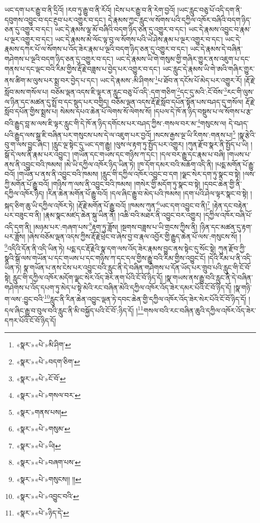 ཡང་དག་པར་རྒྱུ་བ་ནི་དྲིའོ། །རབ་ཏུ་རྒྱུ་བ་ནི་རོའོ། །ངེས་པར་རྒྱུ་བ་ནི་རེག་བྱའོ། །ཡང་རླུང་བཅུ་པོ་འདི་དག་ནི་དབུགས་འབྱུང་བ་དང་རྔུབ་པར་འགྱུར་བ་དང་། དེ་རྣམས་ཀྱང་རླུང་ལ་སོགས་པའི་དཀྱིལ་འཁོར་བཞིའི་བདག་ཉིད་ཅན་དུ་འགྱུར་བ་དང་། ཡང་དེ་རྣམས་ལྷ་མོ་བཞིའི་བདག་ཉིད་ཅན་དུ་འགྱུར་བ་དང་། ཡང་དེ་རྣམས་འབྱུང་བ་རྣམ་པ་ལྔར་འགྱུར་བ་དང་། ཡང་དེ་རྣམས་མེ་ལོང་ལྟ་བུ་ལ་སོགས་པའི་ཡེ་ཤེས་རྣམ་པ་ལྔར་འགྱུར་བ་དང་། ཡང་དེ་རྣམས་དཀར་པོ་ལ་སོགས་པ་འོད་ཟེར་རྣམ་པ་ལྔའི་བདག་ཉིད་ཅན་དུ་འགྱུར་བ་དང་། ཡང་དེ་རྣམས་དེ་བཞིན་གཤེགས་པ་ལྔའི་བདག་ཉིད་ཅན་དུ་འགྱུར་བ་དང་། ཡང་དེ་རྣམས་ཡི་གེ་གསུམ་གྱི་གཞིར་གྱུར་ནས་འཇུག་པ་དང་གནས་པ་དང་ལྡང་བའི་རིམ་གྱིས་རྡོ་རྗེ་བཟླས་པ་བྱེད་པར་འགྱུར་བ་དང་། ཡང་རླུང་དེ་རྣམས་ཡི་གེ་ཨའི་གཞིར་གྱུར་ནས་ཚིག་མ་ལུས་པར་སྨྲ་བར་བྱེད་པ་དང་། ཡང་དེ་རྣམས་:མི་ཤིགས་\footnote{«སྣར་»«པེ་»མི་ཤིག་}པ་ཐོབ་ན་དངོས་པོ་མེད་པར་འགྱུར་རོ། །རྡོ་རྗེ་སློབ་མས་གསོལ་པ། བཅོམ་ལྡན་འདས་ཇི་ལྟར་ན་རླུང་བཅུ་པོ་འདི་:དག་གཅིག་\footnote{«སྣར་»«པེ་»བདག་ཅིག་}དང་དུ་མའི་:ངོ་བོས་\footnote{«སྣར་»«པེ་»ངོ་བོ་}རང་གི་ལུས་ལ་ཉིན་དང་མཚན་དུ་སྤྲོ་བ་དང་སྡུད་པར་བགྱིད། བཅོམ་ལྡན་འདས་རྡོ་རྗེ་སློབ་དཔོན་སྟོན་པས་བཤད་དུ་གསོལ། རྡོ་རྗེ་སློབ་དཔོན་གྱིས་སྨྲས་པ། སེམས་དཔའ་ཆེན་པོ་ལེགས་སོ་ལེགས་སོ། །དཔལ་དེ་ཁོ་ན་ཉིད་བསྡུས་པ་ལ་སོགས་པ་རྩ་བའི་རྒྱུད་བླ་མ་ལས་ཇི་ལྟར་རླུང་གི་དེ་ཁོ་ན་ཉིད་དགོངས་པར་བཤད་ཀྱིས་:གསལ་བར་མ་\footnote{«སྣར་»«པེ་»གསལ་བར་}གསུངས་ལ། དེ་བཤད་པའི་རྒྱུད་ལས་སྒྲ་ཇི་བཞིན་པར་གསུངས་པས་དེ་ལ་འཇུག་པར་བྱའོ། །སངས་རྒྱས་ལྔ་ཡི་རིགས་:གནས་པ།\footnote{«སྣར་»གནས་པས།} །སྣ་རྩེའི་བུ་ག་ལས་བྱུང་ཞིང་། །རླུང་ལྔ་སྟེང་དུ་ཡང་དག་རྒྱུ། །ལུས་ལ་རྟག་ཏུ་སྤྱོད་པར་འགྱུར། །ཀུན་རྫོབ་སྣར་ནི་སྤྱོད་པ་ཡི། །སྒོ་དེ་ལས་ནི་རྣམ་པར་འབྱུང་། །གཡོན་དང་གཡས་དང་གཉིས་ཀ་དང་། །དལ་བར་རྒྱུ་དང་རྣམ་པ་བཞི། །གཡས་པ་ནས་ནི་འབྱུང་བའི་ཁམས། །མེ་ཡི་དཀྱིལ་འཁོར་ཉིད་ཡིན་ཏེ། །ཁ་དོག་དམར་བའི་མཆོག་འདི་ནི། །པདྨ་མགོན་པོ་རྒྱུ་བའོ། །གཡོན་པ་ནས་ནི་འབྱུང་བའི་ཁམས། །རླུང་གི་དཀྱིལ་འཁོར་འབྱུང་བ་དག །ལྗང་སེར་དག་ཏུ་སྣང་བ་སྟེ། །ལས་ཀྱི་མགོན་པོ་རྒྱུ་བའོ། །གཉིས་ཀ་ལས་ནི་འབྱུང་བའི་ཁམས། །གསེར་གྱི་མདོག་ཏུ་སྣང་བ་སྟེ། །དབང་ཆེན་གྱི་ནི་དཀྱིལ་འཁོར་ཉིད། །རིན་ཆེན་མགོན་པོ་རྒྱུ་བའོ། །དལ་ཞིང་རྒྱུ་བ་མེད་པའི་ཁམས། །དག་པའི་ཤེལ་ལྟར་སྣང་བ་སྟེ། །སྐད་ཅིག་ཆུ་ཡི་དཀྱིལ་འཁོར་ཏེ། །རྡོ་རྗེ་མགོན་པོ་རྒྱུ་བའོ། །ཁམས་ཀུན་\footnote{«སྣར་»«པེ་»གསུམ་}ཡང་དག་འབྱུང་བ་ནི།\footnote{«སྣར་»«པེ་»ཡི།} །རྟེན་དང་བརྟེན་པར་བཟུང་བ་ནི། །རྣམ་སྣང་མཛད་ཆེན་སྐུ་ཡིན་ནོ། །འཆི་བའི་མཐར་ནི་འབྱུང་བར་འགྱུར། །དཀྱིལ་འཁོར་བཞི་པོ་འདི་དག་ནི། །མཉམ་པར་:གཞག་པས་\footnote{«སྣར་»«པེ་»བཞག་པས་}རྟག་ཏུ་ཟློས། །སྔགས་བཟླས་པ་ཡི་གྲངས་ཀྱིས་ནི། །ཉིན་དང་མཚན་དུ་རྟག་པར་ཟློས། །ཞེས་བཅོམ་ལྡན་འདས་ཀྱིས་རྡོ་རྗེ་ཕྲེང་བ་ཞེས་བྱ་བ་རྣལ་འབྱོར་གྱི་རྒྱུད་ཆེན་པོ་ལས་:གསུངས་སོ། །\footnote{«སྣར་»«པེ་»གསུངས།། །།}འདིའི་དོན་ནི་འདི་ཡིན་ཏེ། པདྨ་དང་རྡོ་རྗེའི་སྣ་དག་ལས་འོད་ཟེར་རྣམས་བྱུང་ནས་སྟེང་དུ་སོང་སྟེ། ཀུན་རྫོབ་ཀྱི་སྣའི་སྒོ་ལས་གཡོན་པ་དང་གཡས་པ་དང་གཉིས་ཀ་དང་དལ་གྱིས་རྒྱུ་བའི་རིམ་གྱིས་འབྱུང་ངོ། །དེའི་རིམ་པ་ནི་འདི་ཡིན་ཏེ། སྣ་གཡོན་པ་ནས་ངེས་པར་འབྱུང་བའི་རླུང་ནི་དེ་བཞིན་གཤེགས་པ་དོན་ཡོད་པར་གྲུབ་པའི་རླུང་གི་ངོ་བོ་སྟེ། རླུང་གི་དཀྱིལ་འཁོར་མདོག་ལྗང་སེར་འོད་ཟེར་ནག་པོའི་ངོ་བོ་ཉིད་དོ། །སྣ་གཡས་ནས་རྒྱུ་བའི་རླུང་ནི་དེ་བཞིན་གཤེགས་པ་འོད་དཔག་ཏུ་མེད་པ་སྟེ་མེའི་རང་བཞིན་མེའི་དཀྱིལ་འཁོར་འོད་ཟེར་དམར་པོའི་ངོ་བོ་ཉིད་དོ། །སྣ་གཉི་ག་ལས་:བྱུང་བའི་\footnote{«སྣར་»«པེ་»འབྱུང་བའི་}རླུང་ནི་རིན་ཆེན་འབྱུང་ལྡན་ཏེ་དབང་ཆེན་གྱི་དཀྱིལ་འཁོར་འོད་ཟེར་སེར་པོའི་ངོ་བོ་ཉིད་དོ། །དལ་ཞིང་རྒྱུ་བ་བུལ་བའི་རླུང་ནི་མི་བསྐྱོད་པའི་ངོ་བོ་:ཉིད་དོ། །\footnote{«སྣར་»«པེ་»ཉིད་དེ་}གསལ་བའི་རང་བཞིན་ཆུའི་དཀྱིལ་འཁོར་འོད་ཟེར་དཀར་པོའི་ངོ་བོ་ཉིད་དོ། 